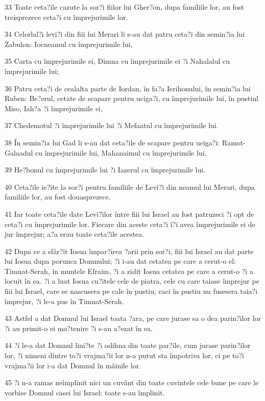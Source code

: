 \par 33 Toate ceta?ile cazute la sor?i fiilor lui Gher?on, dupa familiile lor, au fost treisprezece ceta?i cu împrejurimile lor.
\par 34 Celorlal?i levi?i din fiii lui Merari li s-au dat patru ceta?i din semin?ia lui Zabulon: Iocneamul cu împrejurimile lui,
\par 35 Carta cu împrejurimile ei, Dimna cu împrejurimile ei ?i Nahalalul cu împrejurimile lui;
\par 36 Patru ceta?i de cealalta parte de Iordan, în fa?a Ierihonului, în semin?ia lui Ruben: Be?erul, cetate de scapare pentru uciga?i, cu împrejurimile lui, în pustiul Miso, Iah?a ?i împrejurimile ei,
\par 37 Chedemotul ?i împrejurimile lui ?i Mefaatul cu împrejurimile lui.
\par 38 În semin?ia lui Gad li s-au dat ceta?ile de scapare pentru uciga?i: Ramot-Galaadul cu împrejurimile lui, Mahanaimul cu împrejurimile lui,
\par 39 He?bonul cu împrejurimile lui ?i Iazerul cu împrejurimile lui.
\par 40 Ceta?ile ie?ite la sor?i pentru familiile de Levi?i din neamul lui Merari, dupa familiile lor, au fost douasprezece.
\par 41 Iar toate ceta?ile date Levi?ilor între fiii lui Israel au fost patruzeci ?i opt de ceta?i cu împrejurimile lor. Fiecare din aceste ceta?i î?i avea împrejurimile ei de jur împrejur; a?a erau toate ceta?ile acestea.
\par 42 Dupa ce a sfâr?it Iosua împar?irea ?arii prin sor?i, fiii lui Israel au dat parte lui Iosua dupa porunca Domnului; ?i i-au dat cetatea pe care a cerut-o el: Timnat-Serah, în muntele Efraim, ?i a zidit Iosua cetatea pe care a cerut-o ?i a locuit în ea. ?i a luat Iosua cu?itele cele de piatra, cele cu care taiase împrejur pe fiii lui Israel, care se nascusera pe cale în pustiu, caci în pustiu nu fusesera taia?i împrejur, ?i le-a pus în Timnat-Serah.
\par 43 Astfel a dat Domnul lui Israel toata ?ara, pe care jurase sa o dea parin?ilor lor ?i au primit-o ei mo?tenire ?i s-au a?ezat în ea.
\par 44 ?i le-a dat Domnul lini?te ?i odihna din toate par?ile, cum jurase parin?ilor lor, ?i nimeni dintre to?i vrajma?ii lor n-a putut sta împotriva lor, ci pe to?i vrajma?ii lor i-a dat Domnul în mâinile lor.
\par 45 ?i n-a ramas neîmplinit nici un cuvânt din toate cuvintele cele bune pe care le vorbise Domnul casei lui Israel: toate s-au împlinit.

